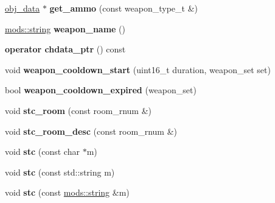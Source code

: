 \begin{DoxyCompactItemize}
\mbox{\label{classmods_1_1player_a1a89b6c5b9e2046ad76d0a1c7d348ba9}} 
\hyperlink{structobj__data}{obj\+\_\+data} $\ast$ {\bfseries get\+\_\+ammo} (const weapon\+\_\+type\+\_\+t \&)
\item 
\mbox{\label{classmods_1_1player_a16d099bf9995465e00b21cfa8f1cd594}} 
\hyperlink{structmods_1_1string}{mods\+::string} {\bfseries weapon\+\_\+name} ()
\item 
\mbox{\label{classmods_1_1player_ae42a701bdd5d5fb46d7658cad6161464}} 
{\bfseries operator chdata\+\_\+ptr} () const
\item 
\mbox{\label{classmods_1_1player_a74ab8e7f2cf826fe6f4a6bc0fa8a0efa}} 
void {\bfseries weapon\+\_\+cooldown\+\_\+start} (uint16\+\_\+t duration, weapon\+\_\+set set)
\item 
\mbox{\label{classmods_1_1player_a2489270f0eeb5e26ec509dcb75cd8bb4}} 
bool {\bfseries weapon\+\_\+cooldown\+\_\+expired} (weapon\+\_\+set)
\item 
\mbox{\label{classmods_1_1player_a05030c2c9439f95c84704ed6f7c993d1}} 
void {\bfseries stc\+\_\+room} (const room\+\_\+rnum \&)
\item 
\mbox{\label{classmods_1_1player_a6195057ece7899142c460e5322498a4a}} 
void {\bfseries stc\+\_\+room\+\_\+desc} (const room\+\_\+rnum \&)
\item 
\mbox{\label{classmods_1_1player_a550769bddbe79e5086130df7deef07f7}} 
void {\bfseries stc} (const char $\ast$m)
\item 
\mbox{\label{classmods_1_1player_a0aaa555bf45fb81f83a08e083f28fac1}} 
void {\bfseries stc} (const std\+::string m)
\item 
\mbox{\label{classmods_1_1player_ac4743c458be0d770a0f45fb7c029aff4}} 
void {\bfseries stc} (const \hyperlink{structmods_1_1string}{mods\+::string} \&m)
\item 
\mbox{\label{classmods_1_1player_a3d00ca11aeb86fa14ed502a661b84d9a}} 

\end{DoxyCompactItemize}

